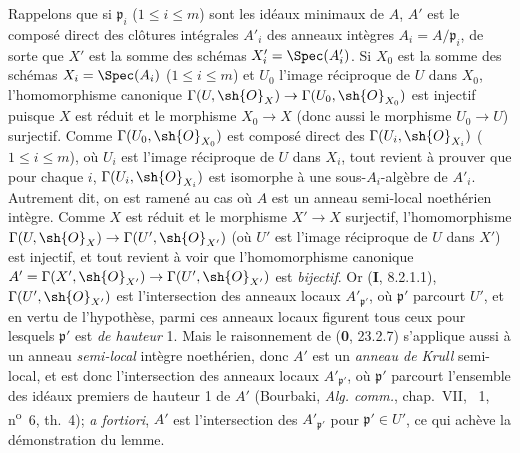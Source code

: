 Rappelons que si $\mathfrak p_i$ ($1\leq i\leq m$) sont les idéaux minimaux de $A$, $A'$ est le composé direct des clôtures intégrales $A'_i$ des anneaux intègres $A_i=A/\mathfrak p_i$, de sorte que $X'$ est la somme des schémas $X'_i=\Spec(A'_i)$. Si $X_0$ est la somme des schémas $X_i=\Spec(A_i)$ ($1\leq i\leq m$) et $U_0$ l'image réciproque de $U$ dans $X_0$, l'homomorphisme canonique $\Gamma(U,\sh{O}_X)\to\Gamma(U_0,\sh{O}_{X_0})$ est injectif puisque $X$ est réduit et le morphisme $X_0\to X$ (donc aussi le morphisme $U_0\to U$) surjectif. Comme $\Gamma(U_0,\sh{O}_{X_0})$ est composé direct des $\Gamma(U_i,\sh{O}_{X_i})$ ($1\leq i\leq m$), où $U_i$ est l'image réciproque de $U$ dans $X_i$, tout revient à prouver que pour chaque $i$, $\Gamma(U_i,\sh{O}_{X_i})$ est isomorphe à une sous-$A_i$-algèbre de $A'_i$. Autrement dit, on est ramené au cas où $A$ est un anneau semi-local noethérien intègre. Comme $X$ est réduit et le morphisme $X'\to X$ surjectif, l'homomorphisme $\Gamma(U,\sh{O}_X)\to\Gamma(U',\sh{O}_{X'})$ (où $U'$ est l'image réciproque de $U$ dans $X'$) est injectif, et tout revient à voir que l'homomorphisme canonique $A'=\Gamma(X',\sh{O}_{X'})\to\Gamma(U',\sh{O}_{X'})$ est \emph{bijectif}. Or (\textbf{I}, 8.2.1.1), $\Gamma(U',\sh{O}_{X'})$ est l'intersection des anneaux locaux $A'_{\mathfrak p'}$, où $\mathfrak p'$ parcourt $U'$, et en vertu de l'hypothèse, parmi ces anneaux locaux figurent tous ceux pour lesquels $\mathfrak p'$ est \emph{de hauteur} 1. Mais le raisonnement de (\textbf{0}, 23.2.7) s'applique aussi à un anneau \emph{semi-local} intègre noethérien, donc $A'$ est un \emph{anneau de Krull} semi-local, et est donc l'intersection des anneaux locaux $A'_{\mathfrak p'}$, où $\mathfrak p'$ parcourt l'ensemble des idéaux premiers de hauteur 1 de $A'$ (Bourbaki, \emph{Alg. comm.}, chap.~VII, \textsection~1, n\textsuperscript{o}~6, th.~4); \emph{a fortiori}, $A'$ est l'intersection des $A'_{\mathfrak p'}$ pour $\mathfrak p'\in U'$, ce qui achève la démonstration du lemme.

